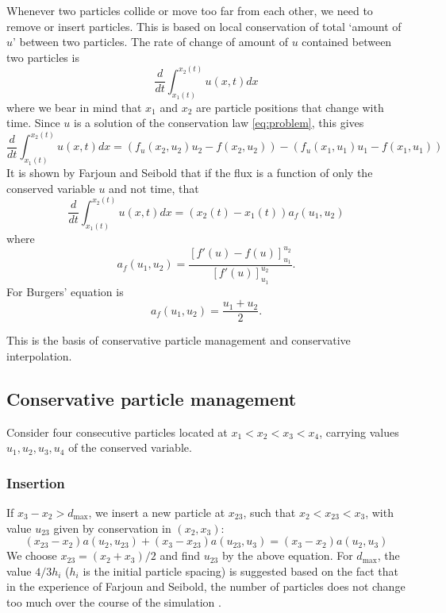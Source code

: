 \documentclass{article}
\begin{document}
Whenever two particles collide or move too far from each other, we need to remove or insert particles. This is based on local conservation of total `amount of $u$' between two particles. The rate of change of amount of $u$ contained between two particles is 
\begin{equation}
	\frac{d}{dt}\int_{x_1(t)}^{x_2(t)}u(x,t)dx
\end{equation}
where we bear in mind that $x_1$ and $x_2$ are particle positions that change with time. Since $u$ is a solution of the conservation law \eqref{eq:problem}, this gives
\begin{equation}
\frac{d}{dt}\int_{x_1(t)}^{x_2(t)}u(x,t)dx = (f_u(x_2,u_2)u_2 - f(x_2,u_2))-(f_u(x_1,u_1)u_1-f(x_1,u_1))
\end{equation}
It is shown by Farjoun and Seibold that if the flux is a function of only the conserved variable $u$ and not time, that
\begin{equation}
\frac{d}{dt}\int_{x_1(t)}^{x_2(t)}u(x,t)dx = (x_2(t)-x_1(t))a_f(u_1,u_2)
\label{eq:area}
\end{equation}
where
\begin{equation}
a_f(u_1,u_2) = \frac{[f'(u)-f(u)]_{u_1}^{u_2}}{[f'(u)]_{u_1}^{u_2}}.
\end{equation}
For Burgers' equation is
\begin{equation}
a_f(u_1,u_2) = \frac{u_1+u_2}{2}.
\end{equation}

This is the basis of conservative particle management and conservative interpolation.

\subsection{Conservative particle management}
Consider four consecutive particles located at $x_1 < x_2 < x_3 < x_4$, carrying values $u_1, u_2, u_3, u_4$ of the conserved variable.

\subsubsection{Insertion} 
If $x_3-x_2 > d_{\mathrm{max}}$, we insert a new particle at $x_{23}$, such that $x_2 < x_{23} < x_3$, with value $u_{23}$ given by conservation in $(x_2, x_3)$:
\begin{equation}
(x_{23}-x_2)a(u_2,u_{23})+(x_3-x_{23})a(u_{23},u_3) = (x_3-x_2)a(u_2,u_3)
\end{equation}
We choose $x_23 = (x_2+x_3)/2$ and find $u_{23}$ by the above equation. For $d_{\mathrm{max}}$, the value $4/3h_i$ ($h_i$ is the initial particle spacing) is suggested based on the fact that in the experience of Farjoun and Seibold, the number of particles does not change too much over the course of the simulation \cite{particle}.
\end{document}
